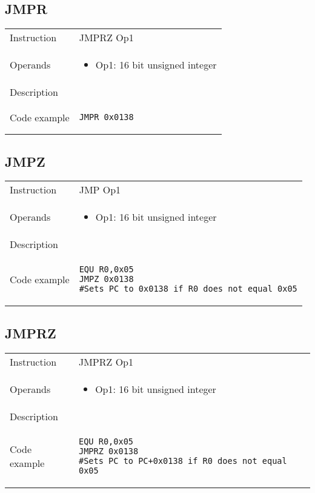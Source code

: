 \subsection{JMPR}
\renewcommand*{\arraystretch}{2.0}
\begin{longtable}{P{3cm}P{9cm}}
\midrule
\noindent Instruction & JMPRZ Op1 \\
\noindent Operands &
\begin{itemize}[label={},noitemsep,leftmargin=*,topsep=0pt,partopsep=0pt, itemsep=1em]
\item Op1: 16 bit unsigned integer
\end{itemize}\\
\noindent Description &  \\
\noindent Code example & 
\begin{lstlisting}
JMPR 0x0138
\end{lstlisting} \\
\end{longtable}

\newpage

\subsection{JMPZ}
\renewcommand*{\arraystretch}{2.0}
\begin{longtable}{P{3cm}P{9cm}}
\midrule
\noindent Instruction & JMP Op1 \\
\noindent Operands &
\begin{itemize}[label={},noitemsep,leftmargin=*,topsep=0pt,partopsep=0pt, itemsep=1em]
\item Op1: 16 bit unsigned integer
\end{itemize}\\
\noindent Description &  \\
\noindent Code example & 
\begin{lstlisting}
EQU R0,0x05
JMPZ 0x0138
#Sets PC to 0x0138 if R0 does not equal 0x05
\end{lstlisting} \\
\end{longtable}


\subsection{JMPRZ}
\renewcommand*{\arraystretch}{2.0}
\begin{longtable}{P{3cm}P{9cm}}
\midrule
\noindent Instruction & JMPRZ Op1 \\
\noindent Operands &
\begin{itemize}[label={},noitemsep,leftmargin=*,topsep=0pt,partopsep=0pt, itemsep=1em]
\item Op1: 16 bit unsigned integer
\end{itemize}\\
\noindent Description &  \\
\noindent Code example & 
\begin{lstlisting}
EQU R0,0x05
JMPRZ 0x0138
#Sets PC to PC+0x0138 if R0 does not equal 0x05
\end{lstlisting} \\
\end{longtable}

